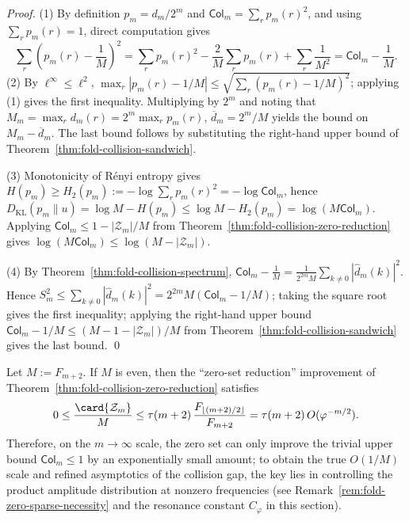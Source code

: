 \begin{proof}
(1) By definition \(p_m=d_m/2^m\) and \(\mathsf{Col}_m=\sum_r p_m(r)^2\), and using \(\sum_r p_m(r)=1\), direct computation gives
\[
\sum_r\left(p_m(r)-\frac{1}{M}\right)^2
=\sum_r p_m(r)^2-\frac{2}{M}\sum_r p_m(r)+\sum_r\frac{1}{M^2}
=\mathsf{Col}_m-\frac{1}{M}.
\]
(2) By \(\ell^\infty\le \ell^2\), \(\max_r|p_m(r)-1/M|\le \sqrt{\sum_r(p_m(r)-1/M)^2}\); applying (1) gives the first inequality.
Multiplying by \(2^m\) and noting that \(M_m=\max_r d_m(r)=2^m\max_r p_m(r)\), \(\overline d_m=2^m/M\) yields the bound on \(M_m-\overline d_m\). The last bound follows by substituting the right-hand upper bound of Theorem~\ref{thm:fold-collision-sandwich}.
\par
(3) Monotonicity of R\'enyi entropy gives \(H(p_m)\ge H_2(p_m):=-\log\sum_r p_m(r)^2=-\log \mathsf{Col}_m\), hence
\(
D_{\mathrm{KL}}(p_m\|u)=\log M-H(p_m)\le \log M-H_2(p_m)=\log(M\mathsf{Col}_m)
\).
Applying \(\mathsf{Col}_m\le 1-|\mathcal{Z}_m|/M\) from Theorem~\ref{thm:fold-collision-zero-reduction} gives \(\log(M\mathsf{Col}_m)\le \log(M-|\mathcal{Z}_m|)\).
\par
(4) By Theorem~\ref{thm:fold-collision-spectrum},
\(
\mathsf{Col}_m-\frac{1}{M}=\frac{1}{2^{2m}M}\sum_{k\ne 0}|\widehat d_m(k)|^2
\).
Hence \(S_m^2\le \sum_{k\ne 0}|\widehat d_m(k)|^2=2^{2m}M(\mathsf{Col}_m-1/M)\); taking the square root gives the first inequality;
applying the right-hand upper bound \(\mathsf{Col}_m-1/M\le (M-1-|\mathcal{Z}_m|)/M\) from Theorem~\ref{thm:fold-collision-sandwich} gives the last bound. \qed
\end{proof}

\begin{corollary}
\label{cor:fold-collision-zero-sparsity-impact}
Let \(M:=F_{m+2}\). If \(M\) is even, then the ``zero-set reduction'' improvement of Theorem~\ref{thm:fold-collision-zero-reduction} satisfies
\[
0\le \frac{\card{\mathcal{Z}_m}}{M}
\le
\tau(m+2)\,\frac{F_{\lfloor (m+2)/2\rfloor}}{F_{m+2}}
=\tau(m+2)\,O(\varphi^{-m/2}).
\]
Therefore, on the \(m\to\infty\) scale, the zero set can only improve the trivial upper bound \(\mathsf{Col}_m\le 1\) by an exponentially small amount; to obtain the true \(O(1/M)\) scale and refined asymptotics of the collision gap, the key lies in controlling the product amplitude distribution at nonzero frequencies (see Remark~\ref{rem:fold-zero-sparse-necessity} and the resonance constant \(C_\varphi\) in this section).
\end{corollary}


